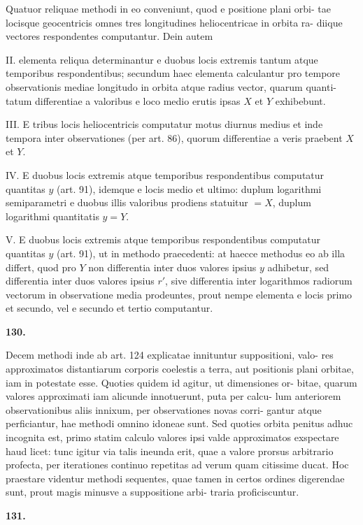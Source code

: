 \documentclass[12pt,a4paper]{article}
\begin{document}
Quatuor reliquae methodi in eo conveniunt, quod e positione plani orbi-
tae locisque geocentricis omnes tres longitudines heliocentricae in orbita ra-
diique vectores respondentes computantur. Dein autem

II. elementa reliqua determinantur e duobus locis extremis tantum atque
temporibus respondentibus; secundum haec elementa calculantur pro tempore
observationis mediae longitudo in orbita atque radius vector, quarum quanti-
tatum differentiae a valoribus e loco medio erutis ipsas $X$ et $Y$ exhibebunt.

III. E tribus locis heliocentricis computatur motus diurnus medius et
inde tempora inter observationes (per art. 86), quorum differentiae a veris
praebent $X$ et $Y$.

IV. E duobus locis extremis atque temporibus respondentibus computatur
quantitas $y$ (art. 91), idemque e locis medio et ultimo: duplum logarithmi
semiparametri e duobus illis valoribus prodiens statuitur $= X$, duplum
logarithmi quantitatis $y = Y$.

V. E duobus locis extremis atque temporibus respondentibus computatur
quantitas $y$ (art. 91), ut in methodo praecedenti: at haecce methodus eo
ab illa differt, quod pro $Y$ non differentia inter duos valores ipsius $y$ adhibetur,
sed differentia inter duos valores ipsius $r'$, sive differentia inter logarithmos
radiorum vectorum in observatione media prodeuntes, prout nempe elementa
e locis primo et secundo, vel e secundo et tertio computantur.


\bigskip
\noindent\textbf{130.}

Decem methodi inde ab art. 124 explicatae innituntur suppositioni, valo-
res approximatos distantiarum corporis coelestis a terra, aut positionis plani
orbitae, iam in potestate esse. Quoties quidem id agitur, ut dimensiones or-
bitae, quarum valores approximati iam alicunde innotuerunt, puta per calcu-
lum anteriorem observationibus aliis innixum, per observationes novas corri-
gantur atque perficiantur, hae methodi omnino idoneae sunt. Sed quoties
orbita penitus adhuc incognita est, primo statim calculo valores ipsi valde
approximatos exspectare haud licet: tunc igitur via talis ineunda erit, quae a
valore prorsus arbitrario profecta, per iterationes continuo repetitas ad verum
quam citissime ducat. Hoc praestare videntur methodi sequentes, quae tamen
in certos ordines digerendae sunt, prout magis minusve a suppositione arbi-
traria proficiscuntur.

\bigskip
\noindent\textbf{131.}
\end{document}
